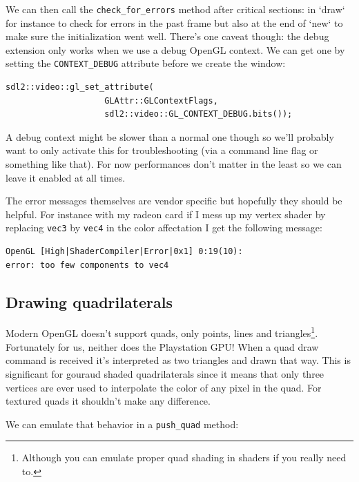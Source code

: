\documentclass[a4paper]{article}
\newcommand{\code}[1] {\texttt{#1}}
\begin{document}
We can then call the \code{check\_for\_errors} method after critical
sections: in `draw` for instance to check for errors in the past frame
but also at the end of `new` to make sure the initialization went
well. There's one caveat though: the debug extension only works when
we use a debug OpenGL context. We can get one by setting the
\code{CONTEXT\_DEBUG} attribute before we create the window:

\begin{lstlisting}
sdl2::video::gl_set_attribute(
                    GLAttr::GLContextFlags,
                    sdl2::video::GL_CONTEXT_DEBUG.bits());
\end{lstlisting}

A debug context might be slower than a normal one though so we'll
probably want to only activate this for troubleshooting (via a command
line flag or something like that). For now performances don't matter
in the least so we can leave it enabled at all times.

The error messages themselves are vendor specific but hopefully they
should be helpful. For instance with my radeon card if I mess up my
vertex shader by replacing \code{vec3} by \code{vec4} in the color
affectation I get the following message:

\begin{verbatim}
OpenGL [High|ShaderCompiler|Error|0x1] 0:19(10):
error: too few components to vec4
\end{verbatim}

\subsection{Drawing quadrilaterals}

Modern OpenGL doesn't support quads, only points, lines and
triangles\footnote{Although you can emulate proper quad shading in
  shaders if you really need to.}. Fortunately for us, neither does
the Playstation GPU! When a quad draw command is received it's
interpreted as two triangles and drawn that way. This is significant
for gouraud shaded quadrilaterals since it means that only three
vertices are ever used to interpolate the color of any pixel in the
quad. For textured quads it shouldn't make any difference.

We can emulate that behavior in a \code{push\_quad} method:
\end{document}
